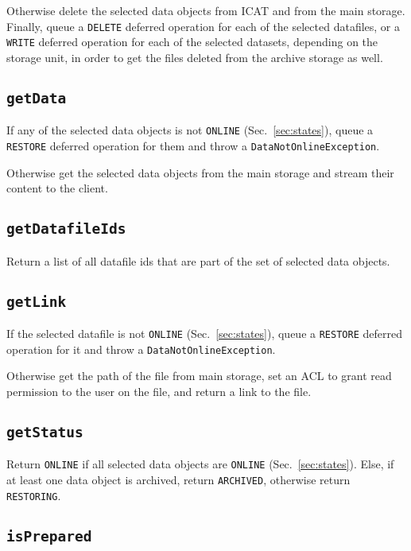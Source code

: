\documentclass[paper=a4]{scrartcl}
\begin{document}
Otherwise delete the selected data objects from ICAT and from the main
storage.  Finally, queue a \texttt{DELETE} deferred operation for each
of the selected datafiles, or a \texttt{WRITE} deferred operation for
each of the selected datasets, depending on the storage unit, in order
to get the files deleted from the archive storage as well.

\subsection{\texttt{getData}}
\label{sec:requests:getdata}

If any of the selected data objects is not \texttt{ONLINE}
(Sec.~\ref{sec:states}), queue a \texttt{RESTORE} deferred operation
for them and throw a \texttt{DataNotOnlineException}.

Otherwise get the selected data objects from the main storage and
stream their content to the client.

\subsection{\texttt{getDatafileIds}}

Return a list of all datafile ids that are part of the set of
selected data objects.

\subsection{\texttt{getLink}}
\label{sec:requests:getlink}

If the selected datafile is not \texttt{ONLINE}
(Sec.~\ref{sec:states}), queue a \texttt{RESTORE} deferred operation
for it and throw a \texttt{DataNotOnlineException}.

Otherwise get the path of the file from main storage, set an ACL to
grant read permission to the user on the file, and return a link to
the file.

\subsection{\texttt{getStatus}}

Return \texttt{ONLINE} if all selected data objects are
\texttt{ONLINE} (Sec.~\ref{sec:states}).  Else, if at least one data
object is archived, return \texttt{ARCHIVED}, otherwise return
\texttt{RESTORING}.

\subsection{\texttt{isPrepared}}
\end{document}

